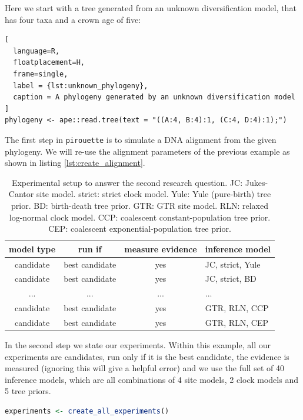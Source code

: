\documentclass{article}
\begin{document}
Here we start with a tree generated from an unknown 
diversification model, that has four taxa and a crown age of five:

\begin{lstlisting}[
  language=R, 
  floatplacement=H, 
  frame=single, 
  label = {lst:unknown_phylogeny},
  caption = A phylogeny generated by an unknown diversification model
]
phylogeny <- ape::read.tree(text = "((A:4, B:4):1, (C:4, D:4):1);")
\end{lstlisting}

The first step in \verb;pirouette; is to simulate a DNA alignment from the given phylogeny. We will re-use the alignment parameters of the previous example as shown in listing \ref{lst:create_alignment}.

\begin{table}
  \begin{tabular}{ | c | c | c | l | }
    \hline
    \textbf{model type} & \textbf{run if} & \textbf{measure evidence} & \textbf{inference model} \\ 
    \hline
    candidate & best candidate & yes & JC, strict, Yule \\
    candidate & best candidate & yes & JC, strict, BD \\
    ...       & ...            & ... & ... \\
    candidate & best candidate & yes & GTR, RLN, CCP \\
    candidate & best candidate & yes & GTR, RLN, CEP \\
    \hline
  \end{tabular}
  \caption{
    Experimental setup to answer the second research question.
    JC: Jukes-Cantor site model.
    strict: strict clock model.
    Yule: Yule (pure-birth) tree prior.
    BD: birth-death tree prior.
    GTR: GTR site model.
    RLN: relaxed log-normal clock model.
    CCP: coalescent constant-population tree prior.
    CEP: coalescent exponential-population tree prior.
  }
\end{table}

In the second step we state our experiments. 
Within this example, all our experiments are candidates,
run only if it is the best candidate, the evidence is measured (ignoring
this will give a helpful error) and we use the full set of 
40 inference models, which are all combinations of 4 site 
models, 2 clock models and 5 tree priors.

\begin{lstlisting}[language=R, floatplacement=H, frame=single]
experiments <- create_all_experiments()
\end{lstlisting}
\end{document}
